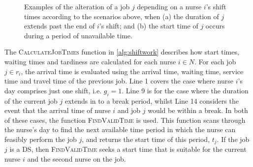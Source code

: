 \documentclass[a4paper,11pt,authoryear]{elsarticle}
\begin{document}
\begin{figure}[h!]
	\centering	
	\begin{subfigure}[h]{\textwidth}
		\centering
		
		\vspace{-2mm}\caption{}
		\label{fig:itemsinfeas}
		\vspace{2mm}
	\end{subfigure}
	\begin{subfigure}[h]{\textwidth}
		\centering
		
		\vspace{-2mm}\caption{}
		\label{fig:itemsfeas}
	\end{subfigure}
	\caption{Examples of the alteration of a job $j$ depending on a nurse $i$'s shift times according to the scenarios above, when (a) the duration of $j$ extends past the end of $i$'s shift; and (b) the start time of $j$ occurs during a period of unavailable time.}
	\label{fig:itemsaligned}
\end{figure}
\noindent The \textsc{CalculateJobTimes} function in \ref{alg:shiftwork} describes how start times, waiting times and tardiness are calculated for each nurse $i \in N$. For each job $j \in r_i$, the arrival time is evaluated using the arrival time, waiting time, service time and travel time of the previous job. Line 1 covers the case where nurse $i$'s day comprises just one shift, i.e. $g_i = 1$. Line 9 is for the case where the duration of the current job $j$ extends in to a break period, whilst Line 14 considers the event that the arrival time of nurse $i$ and job $j$ would be within a break. In both of these cases, the function \textsc{FindValidTime} is used. This function scans through the nurse's day to find the next available time period in which the nurse can feasibly perform the job $j$, and returns the start time of this period, $t_j$. If the job $j$ is a DS, then \textsc{FindValidTime} seeks a start time that is suitable for the current nurse $i$ and the second nurse on the job.
\end{document}
